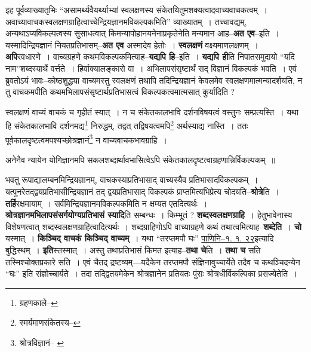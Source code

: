 \documentclass[article,12pt,a4paper]{memoir}
\begin{document}
	  \pstart इह पूर्वव्याख्यातृभिः “असामर्थ्यवैयर्थ्याभ्यां स्वलक्षणस्य संकेतयितुमशक्यत्वादवाच्यवाचकत्वम् । अवाच्यावाचकस्वलक्षणग्राहित्वाच्चेन्द्रियज्ञानमविकल्पकमिति” व्याख्यातम् । तच्चावद्यम्, अन्यथाऽप्यविकल्पत्वस्य सुसाधत्वात् किमन्यापोहानयनेनाप्रकृतेनेति मन्यमान आह--\textbf{अत एव}--इति । यस्मादिन्द्रियज्ञानं नियतप्रतिभासम्--\textbf{अत एव} अस्मादेव हेतोः । \textbf{स्वलक्षणं} वक्ष्यमाणलक्षणम् । \textbf{अपि}रवधारणे । वाच्यग्रहणे कथमविकल्पकमित्याह--\textbf{यद्यपि हि}--इति । \textbf{यद्यपि ही}ति निपातसमुदायो “यदि नाम”शब्दस्यार्थे वर्त्तते । हिर्वाक्यालङ्कारो वा । अभिलापसंसृष्टार्थं सद् विज्ञानं विकल्पकं भवति । एवं ब्रुवतोऽयं भावः--कोष्ठशुद्ध्या वाच्यमस्तु स्वलक्षणं तथापि तदिन्द्रियज्ञानं केवलमेव स्वलक्षणमात्मन्यादर्शयति, न तु वाचकमपीति कथमभिलापसंसृष्टार्थप्रतिभासत्वं विकल्पकत्वमात्मसात् कुर्यादिति ?
	\pend
      \leavevmode{}
	  \bigskip
	  \begingroup
	

	  \pstart स्वलक्षणं वाच्यं वाचकं च गृहीतं स्यात् । न च संकेतकालभावि दर्शनविषयत्वं वस्तुनः सम्प्रत्यस्ति । यथा हि संकेतकालभावि दर्शनमद्य\footnote{ग्रहणकाले--\cite{dp-msD-n}} निरुद्धम्, तद्वत् तद्विषयत्वमपि\footnote{स्मर्यमाणसंकेतस्य--\cite{dp-msD-n}} अर्थस्याद्य नास्ति । ततः पूर्वकालदृष्टत्वमपश्यच्छोत्रज्ञानं\footnote{श्रोत्रविज्ञानं--\cite{dp-msB} \cite{dp-msD} \cite{dp-edN}} न वाच्यवाचकभावग्राहि ।
	\pend
       

	  \pstart अनेनैव न्यायेन योगिज्ञानमपि सकलशब्दार्थावभासित्वेऽपि संकेतकालदृष्टत्वाग्रहणान्निर्विकल्पकम् ॥
	\pend
      
	  \endgroup
	

	  \pstart भवतु रूपाद्यालम्बनमिन्द्रियज्ञानम्, वाचकस्याप्रतिभासाद् वाच्यस्यैव प्रतिभासादविकल्पकम् । यत्पुनरेतद्द्वयप्रतिभासीन्द्रियज्ञानं तद् द्वयप्रतिभासाद् विकल्पकं प्राप्तमित्यभिप्रेत्य चोदयति--\textbf{श्रोत्रे}ति । \textbf{तर्हि}रक्षमायाम् । सर्वमिन्द्रियज्ञानमविकल्पकमिति न क्षम्यत एतदित्यर्थः । \textbf{श्रोत्रज्ञानमभिलापसंसर्गयोग्यप्रतिभासं स्यादि}ति सम्बन्धः । किम्भूतं ? \textbf{शब्दस्वलक्षणग्राहि} । हेतुभावेनास्य विशेषणत्वात् शब्दस्वलक्षणग्राहित्वादित्यर्थः । शब्दग्राहिणोऽपि वाच्याग्रहणे कथं तथात्वमित्याह--\textbf{शब्देति}\leavevmode{} । \textbf{चो} यस्मात् । \textbf{किञ्चिद् वाचकं किञ्चिद् वाच्यम्} । यथा “तरप्तमपौ घः” \href{http://http://sarit.indology.info/?cref=Pā.1.1.22}{पाणिनि--१. १. २२}इत्यादि बुद्धिस्थम् । \textbf{इति}स्तस्मात् । अस्तु तथाप्रतिभासं किमत इत्याह--\textbf{तथा चे}ति । \textbf{तथा च} सति तस्मिश्चोक्तप्रकारे सति । एवं चैतद् द्रष्टव्यम्—यदैकेन तरप्तमपौ संज्ञिनावुच्चार्येते तदैव च कथञ्चिदन्येन “घः” इति संज्ञोच्चार्यते । तदा तद्द्वितयमेकेन श्रोत्रज्ञानेन प्रतियतः पुंसः श्रोत्रधीर्विकल्पिका प्रसज्येतेति ।
	\pend
      
\end{document}
